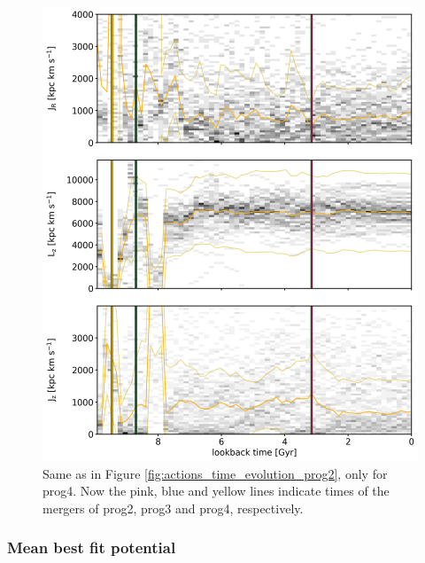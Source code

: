 \begin{figure}[htbp]
\captionsetup{format=plain}
    \centering
	\includegraphics[width=\textwidth]{plots/Dynamics/prog4/action_time_evolution_hist_mean_prog4.png}
    \caption{Same as in Figure \ref{fig:actions_time_evolution_prog2}, only for prog4. Now the pink, blue and yellow lines indicate times of the mergers of prog2, prog3 and prog4, respectively.  }\label{fig:actions_time_evolution_prog4}
\end{figure}

\subsubsection{Mean best fit potential}\label{subsubsec:GCs_actions_time_mean_right_pot}

